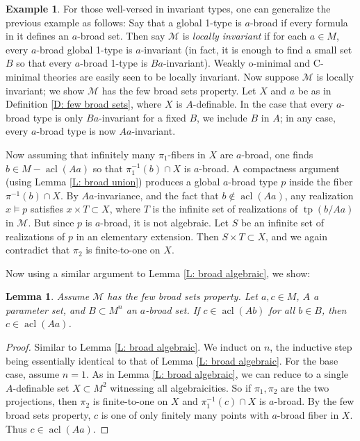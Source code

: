 \documentclass{amsart}
\newtheorem{lemma}[theorem]{Lemma}
\theoremstyle{definition}
\newtheorem{example}[theorem]{Example}
\newcommand{\acl}{\operatorname{acl}}
\newcommand{\tp}{\operatorname{tp}}
\begin{document}
\begin{example} For those well-versed in invariant types, one can generalize the previous example as follows: Say that a global 1-type is $a$-broad if every formula in it defines an $a$-broad set. Then say $\mathcal M$ is \textit{locally invariant} if for each $a\in M$, every $a$-broad global 1-type is $a$-invariant (in fact, it is enough to find a small set $B$ so that every $a$-broad 1-type is $Ba$-invariant). Weakly o-minimal and C-minimal theories are easily seen to be locally invariant. Now suppose $\mathcal M$ is locally invariant; we show $\mathcal M$ has the few broad sets property. Let $X$ and $a$ be as in Definition \ref{D: few broad sets}, where $X$ is $A$-definable. In the case that every $a$-broad type is only $Ba$-invariant for a fixed $B$, we include $B$ in $A$; in any case, every $a$-broad type is now $Aa$-invariant.

Now assuming that infinitely many $\pi_1$-fibers in $X$ are $a$-broad, one finds $b\in M-\acl(Aa)$ so that $\pi_1^{-1}(b)\cap X$ is $a$-broad. A compactness argument (using Lemma \ref{L: broad union}) produces a global $a$-broad type $p$ inside the fiber $\pi^{-1}(b)\cap X$. By $Aa$-invariance, and the fact that $b\notin\acl(Aa)$, any realization $x\models p$ satisfies $x\times T\subset X$, where $T$ is the infinite set of realizations of $\tp(b/Aa)$ in $\mathcal M$. But since $p$ is $a$-broad, it is not algebraic. Let $S$ be an infinite set of realizations of $p$ in an elementary extension. Then $S\times T\subset X$, and we again contradict that $\pi_2$ is finite-to-one on $X$. 
\end{example}

Now using a similar argument to Lemma \ref{L: broad algebraic}, we show:

\begin{lemma}\label{L: broad algebraic 2}
    Assume $\mathcal M$ has the few broad sets property. Let $a,c\in M$, $A$ a parameter set, and $B\subset M^n$ an $a$-broad set. If $c\in\acl(Ab)$ for all $b\in B$, then $c\in\acl(Aa)$.
\end{lemma}
\begin{proof}
    Similar to Lemma \ref{L: broad algebraic}. We induct on $n$, the inductive step being essentially identical to that of Lemma \ref{L: broad algebraic}. For the base case, assume $n=1$. As in Lemma \ref{L: broad algebraic}, we can reduce to a single $A$-definable set $X\subset M^2$ witnessing all algebraicities. So if $\pi_1,\pi_2$ are the two projections, then $\pi_2$ is finite-to-one on $X$ and $\pi_1^{-1}(c)\cap X$ is $a$-broad. By the few broad sets property, $c$ is one of only finitely many points with $a$-broad fiber in $X$. Thus $c\in\acl(Aa)$. 
\end{proof}
\end{document}
